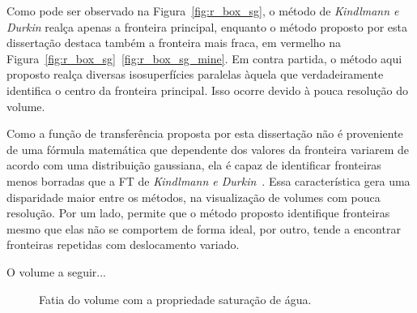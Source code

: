 	Como pode ser observado na Figura~\ref{fig:r_box_sg}, o método de \textit{Kindlmann e Durkin} realça apenas a fronteira principal, enquanto o método proposto por esta dissertação destaca também a fronteira mais fraca, em vermelho na Figura~\ref{fig:r_box_sg}~\ref{fig:r_box_sg_mine}. Em contra partida, o método aqui proposto realça diversas isosuperfícies paralelas àquela que verdadeiramente identifica o centro da fronteira principal. Isso ocorre devido à pouca resolução do volume.
	
	Como a função de transferência proposta por esta dissertação não é proveniente de uma fórmula matemática que dependente dos valores da fronteira variarem de acordo com uma distribuição gaussiana, ela é capaz de identificar fronteiras menos borradas que a FT de \textit{Kindlmann e Durkin}~\cite{gordon}. Essa característica gera uma disparidade maior entre os métodos, na visualização de volumes com pouca resolução. Por um lado, permite que o método proposto identifique fronteiras mesmo que elas não se comportem de forma ideal, por outro, tende a encontrar fronteiras repetidas com deslocamento variado.


	O volume a seguir...
	
\begin{figure}[h]
	\centering
	\caption{Fatia do volume  com a propriedade saturação de água.}
\end{figure}

